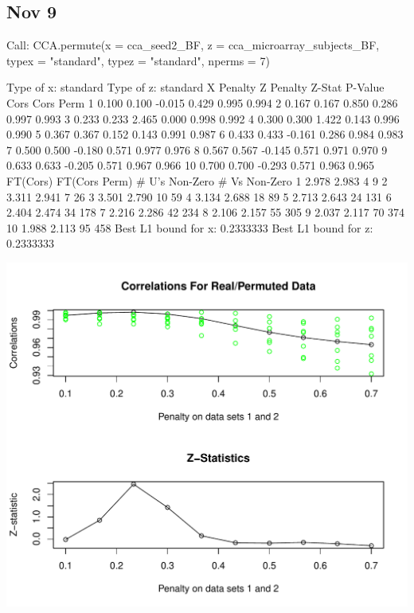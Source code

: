 \documentclass{article}\usepackage[]{graphicx}\usepackage[]{color}
\makeatletter
\def\maxwidth{ %
  \ifdim\Gin@nat@width>\linewidth
    \linewidth
  \else
    \Gin@nat@width
  \fi
}
\makeatother
\begin{document}
  \subsection{Nov 9}
\begin{Schunk}

\begin{Soutput}
Call: CCA.permute(x = cca_seed2_BF, z = cca_microarray_subjects_BF, 
    typex = "standard", typez = "standard", nperms = 7)

Type of x:  standard 
Type of z:  standard 
   X Penalty Z Penalty Z-Stat P-Value  Cors Cors Perm
1      0.100     0.100 -0.015   0.429 0.995     0.994
2      0.167     0.167  0.850   0.286 0.997     0.993
3      0.233     0.233  2.465   0.000 0.998     0.992
4      0.300     0.300  1.422   0.143 0.996     0.990
5      0.367     0.367  0.152   0.143 0.991     0.987
6      0.433     0.433 -0.161   0.286 0.984     0.983
7      0.500     0.500 -0.180   0.571 0.977     0.976
8      0.567     0.567 -0.145   0.571 0.971     0.970
9      0.633     0.633 -0.205   0.571 0.967     0.966
10     0.700     0.700 -0.293   0.571 0.963     0.965
   FT(Cors) FT(Cors Perm) # U's Non-Zero # Vs Non-Zero
1     2.978         2.983              4             9
2     3.311         2.941              7            26
3     3.501         2.790             10            59
4     3.134         2.688             18            89
5     2.713         2.643             24           131
6     2.404         2.474             34           178
7     2.216         2.286             42           234
8     2.106         2.157             55           305
9     2.037         2.117             70           374
10    1.988         2.113             95           458
Best L1 bound for x:  0.2333333
Best L1 bound for z:  0.2333333
\end{Soutput}


{\centering \includegraphics[width=\maxwidth]{figure/Nov_9-1} 

}
\end{Schunk}
\end{document}
